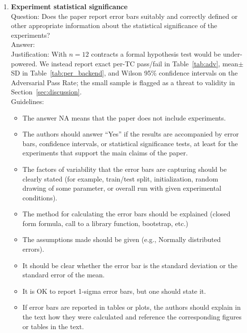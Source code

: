 \documentclass{article}
\begin{document}
\begin{enumerate}
\item {\bf Experiment statistical significance}\\
Question: Does the paper report error bars suitably and correctly defined or other appropriate information about the statistical significance of the experiments?\\
Answer: \answerNo{}\\
Justification: With $n{=}12$ contracts a formal hypothesis test would be under-powered. We instead report exact per-TC pass/fail in Table~\ref{tab:adv}, mean$\pm$SD in Table~\ref{tab:per_backend}, and Wilson 95\% confidence intervals on the Adversarial Pass Rate; the small sample is flagged as a threat to validity in Section~\ref{sec:discussion}.\\
Guidelines:
\begin{itemize}
\item The answer NA means that the paper does not include experiments.
\item The authors should answer ``Yes'' if the results are accompanied by error bars, confidence intervals, or statistical significance tests, at least for the experiments that support the main claims of the paper.
\item The factors of variability that the error bars are capturing should be clearly stated (for example, train/test split, initialization, random drawing of some parameter, or overall run with given experimental conditions).
\item The method for calculating the error bars should be explained (closed form formula, call to a library function, bootstrap, etc.)
\item The assumptions made should be given (e.g., Normally distributed errors).
\item It should be clear whether the error bar is the standard deviation or the standard error of the mean.
\item It is OK to report 1-sigma error bars, but one should state it.
\item If error bars are reported in tables or plots, the authors should explain in the text how they were calculated and reference the corresponding figures or tables in the text.
\end{itemize}


\end{enumerate}
\end{document}
